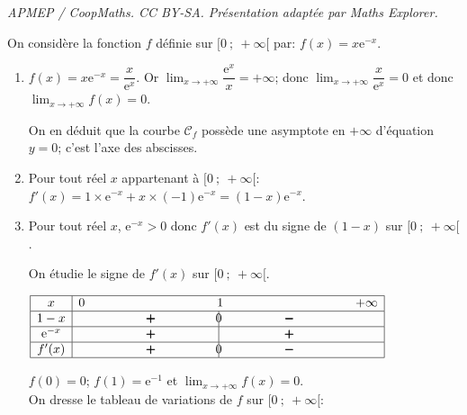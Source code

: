 \documentclass[10pt]{article}
\providecommand{\e}{{\mathrm{e}}}
\providecommand{\ds}{\displaystyle}
\begin{document}
\noindent\textit{APMEP / CoopMaths. CC BY-SA. Présentation adaptée par Maths Explorer.}\par\medskip
\medskip

On considère la fonction $f$ définie sur $[0~;~ +\infty[$ par: $f(x) = x\e^{-x}$.









\begin{enumerate}
\item 



$f(x)=x \e^{-x}=\dfrac{x}{\e^{x}}$.
Or $\ds\lim_{x\to +\infty} \dfrac{\e^{x}}{x}=+\infty$; 
donc $\ds\lim_{x\to +\infty} \dfrac{x}{\e^{x}} =0$ et donc  $\ds\lim_{x\to +\infty} f(x)=0$.

On en déduit que la courbe $\mathcal{C}_f$ possède une asymptote en $+ \infty$ d'équation $y=0$; c'est l'axe des abscisses.

\item Pour tout réel $x$ appartenant à $[0~;~ +\infty[$:
$f'(x)=1\times \e^{-x}+x\times (-1)\e^{-x}=(1-x)\e^{-x}$.

\item 

Pour tout réel $x$, $\e^{-x}>0$ donc $f'(x)$ est du signe de $(1-x)$ sur $[0~;~ +\infty[$.

On étudie le signe de $f'(x)$ sur $[0~;~ +\infty[$.

\begin{center}
{\renewcommand{\arraystretch}{1.5}
\def\esp{\hspace*{3cm}}
$\begin{array}{|c | *{5}{c} |} 
\hline
x  & 0 & \esp & 1 & \esp  & +\infty \\
\hline
1-x &  & \pmb{+} &  \vline\hspace{-2.7pt}{0} & \pmb{-} &   \\
\hline
\e^{-x} &  & \pmb{+} &  \vline\hspace{-2.7pt}{\phantom 0} & \pmb{+} &   \\
\hline
f'(x) &  & \pmb{+} &  \vline\hspace{-2.7pt}{0} & \pmb{-} &   \\
\hline
\end{array}$
}
\end{center}

$f(0)=0$; $f(1)=\e^{-1}$ et $\ds\lim_{x\to +\infty} f(x)=0$.\\
On dresse le tableau de variations de $f$ sur  $[0~;~ +\infty[$:


\end{enumerate}
\end{document}
